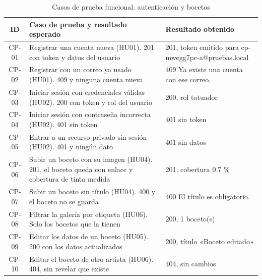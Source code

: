 \begin{table}[H]
  \centering
  \caption{Casos de prueba funcional: autenticación y bocetos}
  \label{tab:casosauth}
  \renewcommand{\arraystretch}{1.2}
  \footnotesize
  \begin{tabular}{|c|p{5.9cm}|p{5.3cm}|}
    \hline
    \textbf{ID} & \textbf{Caso de prueba y resultado esperado} & \textbf{Resultado obtenido} \\
    \hline
    CP-01 & Registrar una cuenta nueva (HU01). 201 con token y datos del usuario & 201, token emitido para cp-mwegg7pc-a@pruebas.local \\ \hline
    CP-02 & Registrar con un correo ya usado (HU01). 409 y ninguna cuenta nueva & 409 Ya existe una cuenta con ese correo. \\ \hline
    CP-03 & Iniciar sesión con credenciales válidas (HU02). 200 con token y rol del usuario & 200, rol tatuador \\ \hline
    CP-04 & Iniciar sesión con contraseña incorrecta (HU02). 401 sin token & 401 sin token \\ \hline
    CP-05 & Entrar a un recurso privado sin sesión (HU02). 401 y ningún dato & 401 sin datos \\ \hline
    CP-06 & Subir un boceto con su imagen (HU04). 201, el boceto queda con enlace y cobertura de tinta medida & 201, cobertura 0.7 \% \\ \hline
    CP-07 & Subir un boceto sin título (HU04). 400 y el boceto no se guarda & 400 El título es obligatorio. \\ \hline
    CP-08 & Filtrar la galería por etiqueta (HU06). Solo los bocetos que la tienen & 200, 1 boceto(s) \\ \hline
    CP-09 & Editar los datos de un boceto (HU05). 200 con los datos actualizados & 200, título «Boceto editado» \\ \hline
    CP-10 & Editar el boceto de otro artista (HU06). 404, sin revelar que existe & 404, sin cambios \\ \hline
  \end{tabular}
\end{table}

